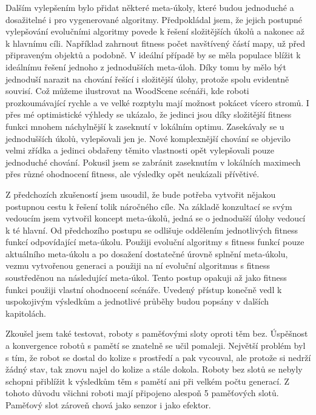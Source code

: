 \par 
Dalším vylepšením bylo přidat některé meta-úkoly, které budou jednoduché a dosažitelné i pro vygenerované algoritmy. Předpokládal jsem, že jejich postupné vylepšování evolučními algoritmy povede k řešení složitějších úkolů a nakonec až k hlavnímu cíli. Například zahrnout fitness počet navštívený částí mapy, už před připraveným objektů a podobně. V ideální případě by se měla populace blížit k ideálnímu řešení jednoho z jednodušších meta-úloh. Díky tomu by mělo být jednoduší narazit na chování řešící i složitější úlohy, protože spolu evidentně souvisí. Což můžeme ilustrovat na WoodScene scénáři, kde roboti prozkoumávající rychle a ve velké rozptylu mají možnost pokácet vícero stromů. I přes mé optimistické výhledy se ukázalo, že jedinci jsou díky složitější fitness funkci mnohem náchylnější k zaseknutí v lokálním optimu. Zasekávaly se u jednodušších úkolů, vylepšovali jen je. Nové komplexnější chování se objevilo velmi zřídka a jedinci obdařeny těmito vlastnosti opět vylepšovali pouze jednoduché chování. Pokusil jsem se zabránit zaseknutím v lokálních maximech přes různé ohodnocení fitness, ale výsledky opět neukázali přívětivé.\par
Z předchozích zkušeností jsem usoudil, že bude potřeba vytvořit nějakou postupnou cestu k řešení tolik náročného cíle.  Na základě konzultací se svým vedoucím jsem vytvořil koncept meta-úkolů, jedná se o jednodušší úlohy vedoucí k té hlavní. Od předchozího postupu se odlišuje oddělením jednotlivých fitness funkcí odpovídající meta-úkolu. Použiji evoluční algoritmy s fitness funkcí pouze aktuálního meta-úkolu a po dosažení dostatečné úrovně splnění meta-úkolu, vezmu vytvořenou generaci a použiji na ní evoluční algoritmus s fitness soustředěnou na následující meta-úkol. Tento postup opakuji až jako fitness funkci použiji vlastní ohodnocení scénáře. Uvedený přístup konečně vedl k uspokojivým výsledkům a jednotlivé průběhy budou popsány v dalších kapitolách. \par 
Zkoušel jsem také testovat, roboty s paměťovými sloty oproti těm bez. Úspěšnost a konvergence robotů s pamětí se znatelně se učil pomaleji. Největší problém byl s tím, že robot se dostal do kolize s prostředí a pak vycouval, ale protože si nedrží žádný stav, tak znovu najel do kolize a stále dokola. Roboty bez slotů se nebyly schopni přiblížit k výsledkům těm s pamětí ani při velkém počtu generací. Z tohoto důvodu všichni roboti mají připojeno alespoň 5 paměťových slotů. Paměťový slot zároveň chová jako senzor i jako efektor. 

